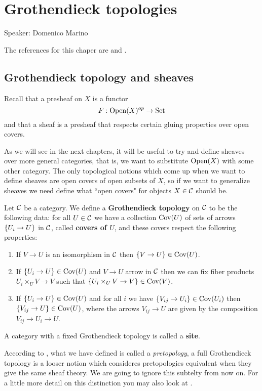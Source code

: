 \chapter{Grothendieck topologies}
\begin{center}
	{\huge Speaker: Domenico Marino}
\end{center}
\bigskip

\noindent
The references for this chaper are \cite{vistoli2007notesgrothendiecktopologiesfibered} and \cite{olsson2016algebraic}.

\section{Grothendieck topology and sheaves}
Recall that a presheaf on $X$ is a functor
\[F:\operatorname{Open}(X)^{op}\to \mathrm{Set}\]
and that a sheaf is a presheaf that respects certain gluing properties over open covers.

As we will see in the next chapters, it will be useful to try and define sheaves over more general categories, that is, we want to substitute $\operatorname{Open}(X)$ with some other category. The only topological notions which come up when we want to define sheaves are open covers of open subsets of $X$, so if we want to generalize sheaves we need define what ``open covers" for objects $X\in \mathcal{C}$ should be.

\begin{definition}[]
Let $\mathcal{C}$ be a category. We define a \textbf{Grothendieck topology} on $\mathcal{C}$ to be the following data: for all $U\in \mathcal{C}$ we have a collection $\operatorname{Cov}(U)$ of sets of arrows $\left\{{U_i\to U}\right\}$ in $\mathcal{C}$, called \textbf{covers of $U$}, and these covers respect the following properties:
\begin{enumerate}
\item If $V\to U$ is an isomorphism in $\mathcal{C}$ then $\left\{{V\to U}\right\}\in \operatorname{Cov}(U)$.
\item If $\left\{{U_i\to U}\right\}\in \operatorname{Cov}(U)$ and $V\to U$ arrow in $\mathcal{C}$ then we can fix fiber products $U_i\times_U V\to V$ such that $\left\{{U_i\times_U V\to V}\right\}\in \operatorname{Cov}(V)$.
\item If $\left\{{U_i\to U}\right\}\in \operatorname{Cov}(U)$ and for all $i$ we have $\left\{{V_{ij}\to U_i}\right\}\in \operatorname{Cov}(U_i)$ then $\left\{{V_{ij}\to U}\right\}\in \operatorname{Cov}(U)$, where the arrows $V_{ij}\to U$ are given by the composition $V_{ij}\to U_i\to U$.
\end{enumerate}
A category with a fixed Grothendieck topology is called a \textbf{site}.
\end{definition}
\begin{remark}
According to \cite{EGA4}, what we have defined is called a \textit{pretopology}, a full Grothendieck topology is a looser notion which consideres pretopologies equivalent when they give the same sheaf theory. We are going to ignore this subtelty from now on. For a little more detail on this distinction you may also look at \cite{vistoli2007notesgrothendiecktopologiesfibered}.
\end{remark}

